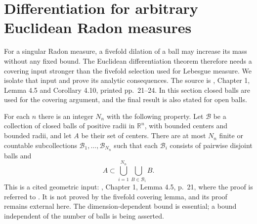 \chapter{Differentiation for arbitrary Euclidean Radon measures}\label{sec:radon-measure-differentiation}
For a singular Radon measure, a fivefold dilation of a ball may increase its mass without any fixed bound. The Euclidean differentiation theorem therefore needs a covering input stronger than the fivefold selection used for Lebesgue measure. We isolate that input and prove its analytic consequences. The source is \cite{Sim18}, Chapter 1, Lemma 4.5 and Corollary 4.10, printed pp.~21--24. In this section closed balls are used for the covering argument, and the final result is also stated for open balls.

\begin{theorem}\label{thm:besicovitch-ball-selection}
For each $n$ there is an integer $N_n$ with the following property. Let $\mathcal B$ be a collection of closed balls of positive radii in $\mathbb R^n$, with bounded centers and bounded radii, and let $A$ be their set of centers. There are at most $N_n$ finite or countable subcollections $\mathcal B_1,\ldots,\mathcal B_{N_n}$ such that each $\mathcal B_i$ consists of pairwise disjoint balls and
\[
 A\subset\bigcup_{i=1}^{N_n}\bigcup_{B\in\mathcal B_i}B.
\]
This is a cited geometric input: \cite{Sim18}, Chapter 1, Lemma 4.5, p.~21, where the proof is referred to \cite{Fed69}. It is not proved by the fivefold covering lemma, and its proof remains external here. The dimension-dependent bound is essential; a bound independent of the number of balls is being asserted.
\end{theorem}

